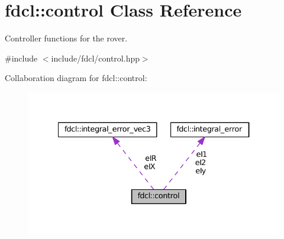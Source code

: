 \hypertarget{classfdcl_1_1control}{}\section{fdcl\+:\+:control Class Reference}
\label{classfdcl_1_1control}


Controller functions for the rover.  




{\ttfamily \#include $<$include/fdcl/control.\+hpp$>$}



Collaboration diagram for fdcl\+:\+:control\+:\nopagebreak
\begin{figure}[H]
\begin{center}
\leavevmode
\includegraphics[width=334pt]{classfdcl_1_1control__coll__graph}
\end{center}
\end{figure}
